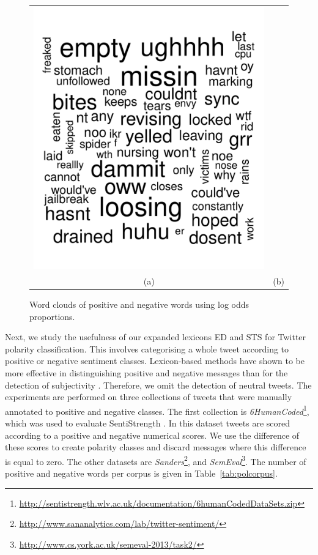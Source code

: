 \documentclass{sig-alternate}
\begin{document}
\begin{figure}[ht]
\begin{center}
\begin{tabular}{cc}
\includegraphics[scale=0.25]{negwords.pdf}\\
(a) & (b)  
\end{tabular}
\caption{Word clouds of positive and negative words using log odds proportions.}
\label{fig:wordcloud}
\end{center}
\end{figure}



Next, we study the usefulness of our expanded lexicons ED and STS for Twitter polarity classification. This involves categorising a whole tweet according to positive or negative sentiment classes. Lexicon-based methods have shown to be more effective in distinguishing positive and negative messages than for the detection of subjectivity \cite{BravoMarquez2014}. Therefore, we omit the detection of neutral tweets. The experiments are performed on three collections of tweets that were manually annotated to positive and negative classes. The first collection is  \emph{6HumanCoded}\footnote{\url{http://sentistrength.wlv.ac.uk/documentation/6humanCodedDataSets.zip}}, which was used to evaluate SentiStrength \cite{ThelwallBP12}.  In this dataset tweets are scored according to a positive and negative numerical scores. We use the difference of these scores to create polarity classes and discard messages where this difference is equal to zero. The other datasets are   \emph{Sanders}\footnote{\url{http://www.sananalytics.com/lab/twitter-sentiment/}}, and \emph{SemEval}\footnote{\url{http://www.cs.york.ac.uk/semeval-2013/task2/}}. The number of positive and negative words per corpus is given in Table~\ref{tab:polcorpus}.
  
\end{document}
